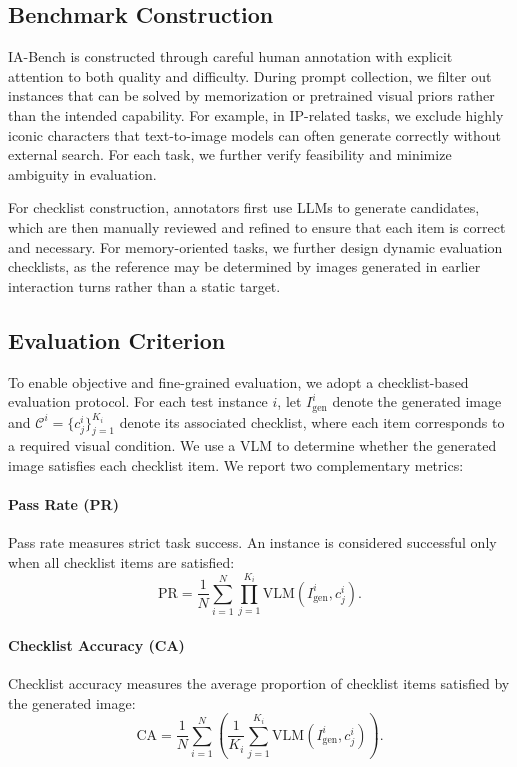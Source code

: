 \subsection{Benchmark Construction}

IA-Bench is constructed through careful human annotation with explicit attention to both quality and difficulty. During prompt collection, we filter out instances that can be solved by memorization or pretrained visual priors rather than the intended capability. For example, in IP-related tasks, we exclude highly iconic characters that text-to-image models can often generate correctly without external search. For each task, we further verify feasibility and minimize ambiguity in evaluation.

For checklist construction, annotators first use LLMs to generate candidates, which are then manually reviewed and refined to ensure that each item is correct and necessary. For memory-oriented tasks, we further design dynamic evaluation checklists, as the reference may be determined by images generated in earlier interaction turns rather than a static target.

\subsection{Evaluation Criterion}

To enable objective and fine-grained evaluation, we adopt a checklist-based evaluation protocol. For each test instance $i$, let $I^{i}_{\mathrm{gen}}$ denote the generated image and $\mathcal{C}^{i} = \{c^{i}_{j}\}_{j=1}^{K_i}$ denote its associated checklist, where each item corresponds to a required visual condition. We use a VLM to determine whether the generated image satisfies each checklist item. We report two complementary metrics:

\paragraph{Pass Rate (PR)}
Pass rate measures strict task success. An instance is considered successful only when all checklist items are satisfied:
\[
\mathrm{PR} = \frac{1}{N}\sum_{i=1}^{N}\prod_{j=1}^{K_i} \mathrm{VLM}(I^{i}_{\mathrm{gen}}, c^{i}_{j}).
\]

\paragraph{Checklist Accuracy (CA)}
Checklist accuracy measures the average proportion of checklist items satisfied by the generated image:
\[
\mathrm{CA} = \frac{1}{N}\sum_{i=1}^{N}\left(\frac{1}{K_i}\sum_{j=1}^{K_i} \mathrm{VLM}(I^{i}_{\mathrm{gen}}, c^{i}_{j})\right).
\]


